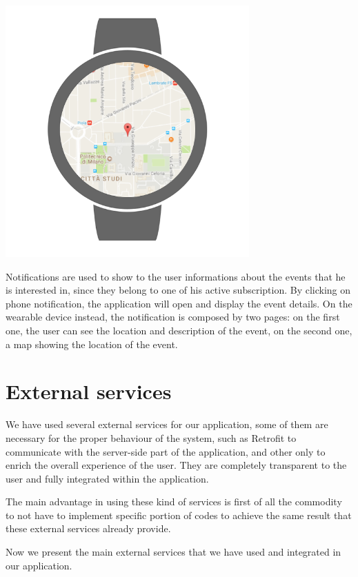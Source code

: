 \documentclass[a4paper]{scrreprt}
\begin{document}
\begin{minipage}{0.33\textwidth}
	\centering
	\includegraphics[width=0.7\textwidth]{imgs/notification_wear_map.png}
\end{minipage}
\par\bigskip
Notifications are used to show to the user informations about the events that he is interested in, since they belong to one of his active subscription. By clicking on phone notification, the application will open and display the event details. On the wearable device instead, the notification is composed by two pages: on the first one, the user can see the location and description of the event, on the second one, a map showing the location of the event.

\chapter{External services}
We have used several external services for our application, some of them are necessary for the proper behaviour of the system, such as Retrofit to communicate with the server-side part of the application, and other only to enrich the overall experience of the user. They are completely transparent to the user and fully integrated within the application.
\par The main advantage in using these kind of services is first of all the commodity to not have to implement specific portion of codes to achieve the same result that these external services already provide.
\par Now we present the main external services that we have used and integrated in our application.
\end{document}
